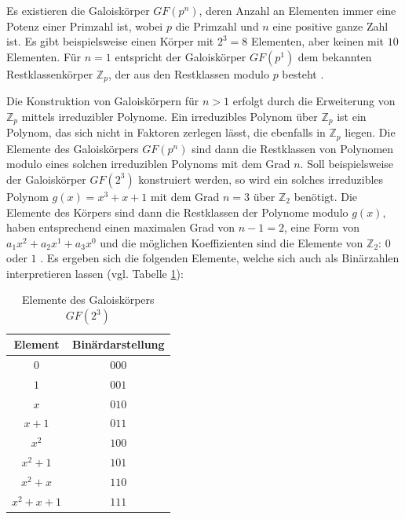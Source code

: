 Es existieren die Galoiskörper \(GF(p^n)\), deren Anzahl an Elementen immer eine Potenz einer Primzahl ist, wobei \(p\) die Primzahl und \(n\) eine positive ganze Zahl ist. Es gibt beispielsweise einen Körper mit \(2^3 = 8\) Elementen, aber keinen mit \(10\) Elementen. Für \(n = 1\) entspricht der Galoiskörper \(GF(p^1)\) dem bekannten Restklassenkörper \(\mathbb{Z}_p\), der aus den Restklassen modulo \(p\) besteht \cite{Springer_RS}.

Die Konstruktion von Galoiskörpern für \(n > 1\) erfolgt durch die Erweiterung von \(\mathbb{Z}_p\) mittels irreduzibler Polynome. Ein irreduzibles Polynom über \(\mathbb{Z}_p\) ist ein Polynom, das sich nicht in Faktoren zerlegen lässt, die ebenfalls in \(\mathbb{Z}_p\) liegen. Die Elemente des Galoiskörpers \(GF(p^n)\) sind dann die Restklassen von Polynomen modulo eines solchen irreduziblen Polynoms mit dem Grad \(n\). Soll beispielsweise der Galoiskörper \(GF(2^3)\) konstruiert werden, so wird ein solches irreduzibles Polynom \(g(x)= x^3 + x + 1\) mit dem Grad \(n = 3\) über \(\mathbb{Z}_2\) benötigt. Die Elemente des Körpers sind dann die Restklassen der Polynome modulo \(g(x)\), haben entsprechend einen maximalen Grad von \(n - 1 = 2\), eine Form von \(a_1 x^2 + a_2 x^1 + a_3 x^0\) und die möglichen Koeffizienten sind die Elemente von $\mathbb{Z}_2$: \(0\) oder \(1\) \cite{Springer_RS}. Es ergeben sich die folgenden Elemente, welche sich auch als Binärzahlen interpretieren lassen (vgl. Tabelle \ref{tab:gf8}):

\begin{table}[H]
    \centering
    \begin{tabular}{|c|c|}
        \hline
        Element & Binärdarstellung \\
        \hline
        \(0\) & \(000\) \\
        \(1\) & \(001\) \\
        \(x\) & \(010\) \\
        \(x + 1\) & \(011\) \\
        \(x^2\) & \(100\) \\
        \(x^2 + 1\) & \(101\) \\
        \(x^2 + x\) & \(110\) \\
        \(x^2 + x + 1\) & \(111\) \\
        \hline
    \end{tabular}
    \caption{Elemente des Galoiskörpers \(GF(2^3)\)}
    \label{tab:gf8}
\end{table}

